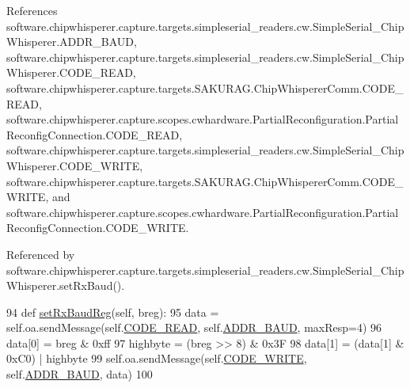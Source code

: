 References software.\+chipwhisperer.\+capture.\+targets.\+simpleserial\+\_\+readers.\+cw.\+Simple\+Serial\+\_\+\+Chip\+Whisperer.\+A\+D\+D\+R\+\_\+\+B\+A\+U\+D, software.\+chipwhisperer.\+capture.\+targets.\+simpleserial\+\_\+readers.\+cw.\+Simple\+Serial\+\_\+\+Chip\+Whisperer.\+C\+O\+D\+E\+\_\+\+R\+E\+A\+D, software.\+chipwhisperer.\+capture.\+targets.\+S\+A\+K\+U\+R\+A\+G.\+Chip\+Whisperer\+Comm.\+C\+O\+D\+E\+\_\+\+R\+E\+A\+D, software.\+chipwhisperer.\+capture.\+scopes.\+cwhardware.\+Partial\+Reconfiguration.\+Partial\+Reconfig\+Connection.\+C\+O\+D\+E\+\_\+\+R\+E\+A\+D, software.\+chipwhisperer.\+capture.\+targets.\+simpleserial\+\_\+readers.\+cw.\+Simple\+Serial\+\_\+\+Chip\+Whisperer.\+C\+O\+D\+E\+\_\+\+W\+R\+I\+T\+E, software.\+chipwhisperer.\+capture.\+targets.\+S\+A\+K\+U\+R\+A\+G.\+Chip\+Whisperer\+Comm.\+C\+O\+D\+E\+\_\+\+W\+R\+I\+T\+E, and software.\+chipwhisperer.\+capture.\+scopes.\+cwhardware.\+Partial\+Reconfiguration.\+Partial\+Reconfig\+Connection.\+C\+O\+D\+E\+\_\+\+W\+R\+I\+T\+E.



Referenced by software.\+chipwhisperer.\+capture.\+targets.\+simpleserial\+\_\+readers.\+cw.\+Simple\+Serial\+\_\+\+Chip\+Whisperer.\+set\+Rx\+Baud().


\begin{DoxyCode}
94     \textcolor{keyword}{def }\hyperlink{classsoftware_1_1chipwhisperer_1_1capture_1_1targets_1_1simpleserial__readers_1_1cw_1_1SimpleSerial__ChipWhisperer_a6b98e02ade57d2cde54fbce3010c7961}{setRxBaudReg}(self, breg):
95         data = self.oa.sendMessage(self.\hyperlink{classsoftware_1_1chipwhisperer_1_1capture_1_1targets_1_1simpleserial__readers_1_1cw_1_1SimpleSerial__ChipWhisperer_a4c5517e6c34f42b975c6d04e9622eed2}{CODE\_READ}, self.\hyperlink{classsoftware_1_1chipwhisperer_1_1capture_1_1targets_1_1simpleserial__readers_1_1cw_1_1SimpleSerial__ChipWhisperer_adbc80aae924a46ce425d4d3e5361fb96}{ADDR\_BAUD}, maxResp=4)
96         data[0] = breg & 0xff
97         highbyte = (breg >> 8) & 0x3F
98         data[1] = (data[1] & 0xC0) | highbyte
99         self.oa.sendMessage(self.\hyperlink{classsoftware_1_1chipwhisperer_1_1capture_1_1targets_1_1simpleserial__readers_1_1cw_1_1SimpleSerial__ChipWhisperer_a72fb88df1724ffc97de6509f2b4c5b41}{CODE\_WRITE}, self.\hyperlink{classsoftware_1_1chipwhisperer_1_1capture_1_1targets_1_1simpleserial__readers_1_1cw_1_1SimpleSerial__ChipWhisperer_adbc80aae924a46ce425d4d3e5361fb96}{ADDR\_BAUD}, data)
100 
\end{DoxyCode}
\hypertarget{classsoftware_1_1chipwhisperer_1_1capture_1_1targets_1_1simpleserial__readers_1_1cw_1_1SimpleSerial__ChipWhisperer_a626fd89511a607859bdd68ae87913d13}{}
